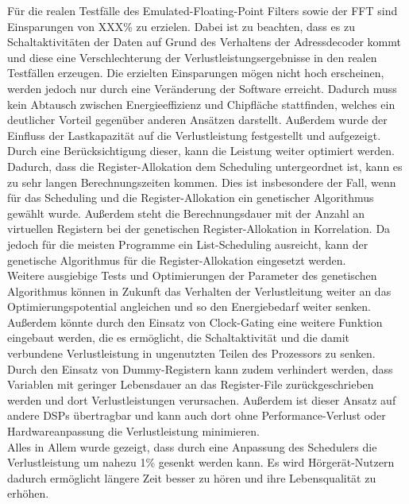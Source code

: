 Für die realen Testfälle des Emulated-Floating-Point Filters sowie der FFT sind Einsparungen von XXX\% zu erzielen. Dabei ist zu beachten, dass es zu Schaltaktivitäten der Daten auf Grund des Verhaltens der Adressdecoder kommt und diese eine Verschlechterung der Verlustleistungsergebnisse in den realen Testfällen erzeugen.
Die erzielten Einsparungen mögen nicht hoch erscheinen, werden jedoch nur durch eine Veränderung der Software erreicht. Dadurch muss kein Abtausch zwischen Energieeffizienz und Chipfläche stattfinden, welches ein deutlicher Vorteil gegenüber anderen Ansätzen darstellt.
Außerdem wurde der Einfluss der Lastkapazität auf die Verlustleistung festgestellt und aufgezeigt. Durch eine Berücksichtigung dieser, kann die Leistung weiter optimiert werden.
Dadurch, dass die Register-Allokation dem Scheduling untergeordnet ist, kann es zu sehr langen Berechnungszeiten kommen. Dies ist insbesondere der Fall, wenn für das Scheduling und die Register-Allokation ein genetischer Algorithmus gewählt wurde. Außerdem steht die Berechnungsdauer mit der Anzahl an virtuellen Registern bei der genetischen Register-Allokation in Korrelation. Da jedoch für die meisten Programme ein List-Scheduling ausreicht, kann der genetische Algorithmus für die Register-Allokation eingesetzt werden.\\
Weitere ausgiebige Tests und Optimierungen der Parameter des genetischen Algorithmus können in Zukunft das Verhalten der Verlustleitung weiter an das Optimierungspotential angleichen und so den Energiebedarf weiter senken. Außerdem könnte durch den Einsatz von Clock-Gating eine weitere Funktion eingebaut werden, die es ermöglicht, die Schaltaktivität und die damit verbundene Verlustleistung in ungenutzten Teilen des Prozessors zu senken. Durch den Einsatz von Dummy-Registern kann zudem verhindert werden, dass Variablen mit geringer Lebensdauer an das Register-File zurückgeschrieben werden und dort Verlustleistungen verursachen. Außerdem ist dieser Ansatz auf andere DSPs übertragbar und kann auch dort ohne Performance-Verlust oder Hardwareanpassung die Verlustleistung minimieren.\\
Alles in Allem wurde gezeigt, dass durch eine Anpassung des Schedulers die Verlustleistung um nahezu 1\% gesenkt werden kann. Es wird Hörgerät-Nutzern dadurch ermöglicht längere Zeit besser zu hören und ihre Lebensqualität zu erhöhen.\\
%


